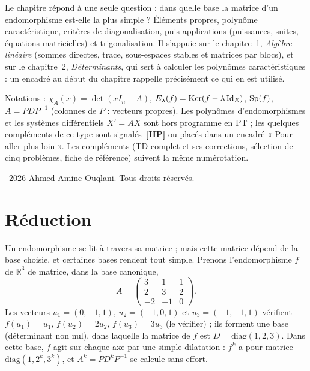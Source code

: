 \documentclass[a4paper,11pt]{article}
\numberwithin{equation}{section}
\numberwithin{figure}{section}
\numberwithin{table}{section}
\theoremstyle{enonce}
\theoremstyle{exemple}
\theoremstyle{remarque}
\newcommand{\R}{\mathbb{R}}
\newcommand{\Id}{\operatorname{Id}}
\newif\ifonglets \ongletsfalse
\newcommand{\HP}{\,{\sffamily\bfseries\scriptsize\textcolor{Brique}{[HP]}}}
\begin{document}
Le chapitre répond à une seule question : dans quelle base la matrice d'un endomorphisme est-elle la plus simple ? Éléments
propres, polynôme caractéristique, critères de diagonalisation, puis applications (puissances, suites, équations matricielles)
et trigonalisation. Il s'appuie sur le chapitre~1, \emph{Algèbre linéaire} (sommes directes, trace, sous-espaces stables et
matrices par blocs), et sur le chapitre~2, \emph{Déterminants}, qui sert à calculer les polynômes caractéristiques : un encadré
au début du chapitre rappelle précisément ce qui en est utilisé.

Notations : $\chi_A(x)=\det(xI_n-A)$, $E_\lambda(f)=\Ker(f-\lambda\Id_E)$, $\operatorname{Sp}(f)$, $A=PDP^{-1}$ (colonnes de $P$ : vecteurs propres).
Les polynômes d'endomorphismes et les systèmes différentiels $X'=AX$ sont hors programme en PT ; les quelques compléments de ce
type sont signalés \HP{} ou placés dans un encadré « Pour aller plus loin ».
Les compléments (TD complet et ses corrections, sélection de cinq problèmes, fiche de référence) suivent la même numérotation.

\vfill
{\footnotesize\sffamily\color{Gris}\textcopyright~2026 Ahmed Amine Ouqlani. Tous droits réservés.\par}
\clearpage
\thispagestyle{plain}
\hypertarget{toc}{}
\renewcommand{\contentsname}{Sommaire}
\tableofcontents
\clearpage
{}
\ongletstrue
\clearpage
\section{Réduction}\label{sec:red}

Un endomorphisme se lit à travers sa matrice ; mais cette matrice dépend de la base choisie, et certaines bases rendent
tout simple. Prenons l'endomorphisme $f$ de $\R^3$ de matrice, dans la base canonique,
\[A=\begin{pmatrix}3&1&1\\2&3&2\\-2&-1&0\end{pmatrix}.\]
Les vecteurs $u_1=(0,-1,1)$, $u_2=(-1,0,1)$ et $u_3=(-1,-1,1)$ vérifient $f(u_1)=u_1$, $f(u_2)=2u_2$, $f(u_3)=3u_3$ (le vérifier) ;
ils forment une base (déterminant non nul), dans laquelle la matrice de $f$ est $D=\mathrm{diag}(1,2,3)$. Dans cette base,
$f$ agit sur chaque axe par une simple dilatation : $f^k$ a pour matrice $\mathrm{diag}(1,2^k,3^k)$, et $A^k=PD^kP^{-1}$ se
calcule sans effort.
\end{document}
